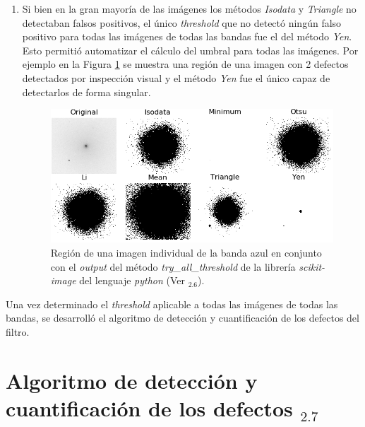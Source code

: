 \begin{enumerate}
\item Si bien en la gran mayoría de las imágenes los métodos \textit{Isodata}\cite{ridler} y \textit{Triangle}\cite{triang} no detectaban falsos positivos, el único \textit{threshold} que no detectó ningún falso positivo para todas las imágenes de todas las bandas fue el del método \textit{Yen}. Esto permitió automatizar el cálculo del umbral para todas las imágenes. Por ejemplo en la Figura \ref{fig:threshcom2} se muestra una región de una imagen con 2 defectos detectados por inspección visual y el método \textit{Yen} fue el único capaz de detectarlos de forma singular.

\begin{figure}[H]
	\centering
	\includegraphics[width=1.0\textwidth]{Figs/defectosZEISS/thresh_vivos_compar3.png}
	\caption{Región de una imagen individual de la banda azul en conjunto con el \textit{output} del método \textit{try\_all\_threshold} de la librería \textit{scikit-image} del lenguaje \textit{python} (Ver \href{https://github.com/jrr1984/defects_analysis/blob/master/try_all_thresholds.py}{\faGithub$_{2.6}$}).} 
	\label{fig:threshcom2}
\end{figure}
\end{enumerate}


\hspace{0.5cm}Una vez determinado el \textit{threshold} aplicable a todas las imágenes de todas las bandas, se desarrolló el algoritmo de detección y cuantificación de los defectos del filtro.


\singlespacing
\section{Algoritmo de detección y cuantificación de los defectos \href{https://github.com/jrr1984/defects_analysis/blob/master/defects_thresholding.py}{\faGithub$_{2.7}$}}
\label{sec:secalg}

